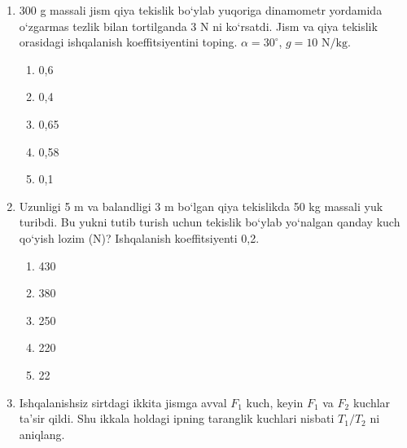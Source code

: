 \begin{enumerate}
\item 300 g massali jism qiya tekislik bo‘ylab yuqoriga dinamometr yordamida o‘zgarmas tezlik bilan tortilganda 3 N ni ko`rsatdi. Jism va qiya tekislik orasidagi ishqalanish koeffitsiyentini toping. $\alpha=30^\circ$,
$g=10\text{ N/kg}$.

\begin{enumerate}[label=\Alph*)]
\item 0,6
\item 0,4
\item 0,65
\item 0,58
\item 0,1
\end{enumerate}


\item Uzunligi 5 m va balandligi 3 m bo‘lgan qiya tekislikda 50 kg massali yuk turibdi. Bu yukni tutib turish uchun tekislik bo‘ylab yo‘nalgan qanday kuch qo‘yish lozim (N)? Ishqalanish koeffitsiyenti 0,2.

\begin{enumerate}[label=\Alph*)]
\item 430
\item 380
\item 250
\item 220
\item 22
\end{enumerate}


\item Ishqalanishsiz sirtdagi ikkita jismga avval $F_1$ kuch, keyin $F_1$ va $F_2$ kuchlar ta’sir qildi.
Shu ikkala holdagi ipning taranglik kuchlari nisbati $T_1/T_2$ ni aniqlang.


\end{enumerate}
